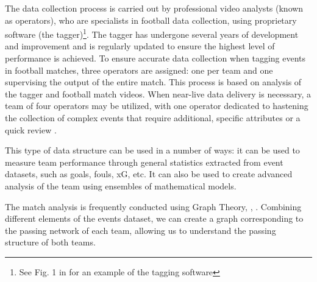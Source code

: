 \documentclass[
  10pt,
  twoside,nohyper]{book}
\begin{document}
The data collection process is carried out by professional video
analysts (known as operators), who are specialists in football data
collection, using proprietary software (the tagger)\footnote{See Fig. 1 in \autocite{3} for an example of the tagging software}. The tagger has
undergone several years of development and improvement and is regularly
updated to ensure the highest level of performance is achieved. To
ensure accurate data collection when tagging events in football matches,
three operators are assigned: one per team and one supervising the
output of the entire match. This process is based on analysis of the
tagger and football match videos. When near-live data delivery is
necessary, a team of four operators may be utilized, with one operator
dedicated to hastening the collection of complex events that require
additional, specific attributes or a quick review \autocite{3}.

\begin{table}[!h]
\centering
\caption{\label{tab:event}Example of an events dataset of a game.}
\centering
{}
\end{table}

This type of data structure can be used in a number of ways: it can be
used to measure team performance through general statistics extracted
from event datasets, such as goals, fouls, xG, etc. It can also be used to create advanced analysis of the team using ensembles of mathematical models.

The match analysis is frequently conducted using Graph Theory, \autocite{Buldu}, \autocite{NOVILLO2024114355}. Combining
different elements of the events dataset, we can create a graph
corresponding to the passing network of each team, allowing us to
understand the passing structure of both teams.
\end{document}
